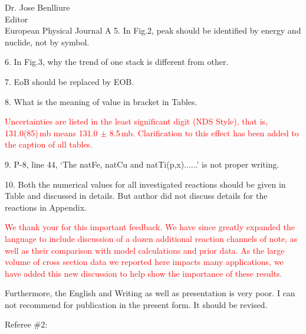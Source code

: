 \documentclass{letter} %
\newcommand{\colornote}[1]{\textcolor{red}{#1}}
\begin{document}
\begin{letter}{Dr. Jose Benlliure \\
Editor \\
European Physical Journal A}
5. In Fig.2, peak should be identified by energy and nuclide, not by symbol.

6. In Fig.3, why the trend of one stack is different from other.

7. EoB should be replaced by EOB.

8. What is the meaning of value in bracket in Tables.

\colornote{Uncertainties are listed in the least significant digit (NDS Style), that is, 131.0(85)\,mb  means 131.0 $\pm$ 8.5\,mb. Clarification to this effect has been added to the caption of all tables.}

9. P-8, line 44, ‘The natFe, natCu and natTi(p,x)......’ is not proper writing.

10. Both the numerical values for all investigated reactions should be given in Table and discussed in
details. But author did not discuss details for the reactions in Appendix.

\colornote{We thank your for this important feedback. We have since greatly expanded the language to include discussion of a dozen additional reaction channels of note, as well as their comparison with model calculations and prior data. As the large volume of cross section data we reported here  impacts  many applications,  we have added this new discussion to help show the importance of these results.}

Furthermore, the English and Writing as well as presentation is very poor. I can not recommend for
publication in the present form. It should be revised.





 
 
\pagebreak


 Referee \#2:




\end{letter}
\end{document}
